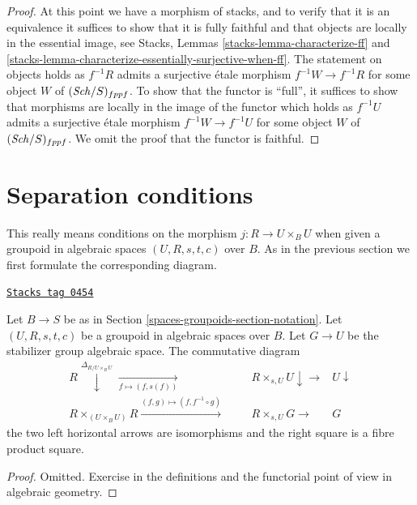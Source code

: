 \begin{proof}
\medskip\noindent
At this point we have a morphism of stacks, and to verify that it is an
equivalence it suffices to show that it is fully faithful and that
objects are locally in the essential image, see
Stacks, Lemmas \ref{stacks-lemma-characterize-ff} and
\ref{stacks-lemma-characterize-essentially-surjective-when-ff}.
The statement on objects holds as $f^{-1}R$ admits a surjective \'etale
morphism $f^{-1}W \to f^{-1}R$ for some object $W$ of
$(\mathit{Sch}/S)_{fppf}$. To show that the functor is ``full'', it
suffices to show that morphisms are locally in the image
of the functor which holds as $f^{-1}U$ admits a surjective \'etale morphism
$f^{-1}W \to f^{-1}U$ for some object $W$ of $(\mathit{Sch}/S)_{fppf}$.
We omit the proof that the functor is faithful.
\end{proof}

\section{Separation conditions}
\label{spaces-groupoids-section-separation}
This really means conditions on the morphism $j : R \to U \times_B U$
when given a groupoid in algebraic spaces $(U, R, s, t, c)$ over $B$.
As in the previous section we first formulate the corresponding diagram.

\begin{lemma}
\label{spaces-groupoids-lemma-diagram-diagonal}
\href{https://stacks.math.columbia.edu/tag/0454}{\texttt{Stacks tag 0454}}

Let $B \to S$ be as in Section \ref{spaces-groupoids-section-notation}.
Let $(U, R, s, t, c)$ be a groupoid in algebraic spaces over $B$.
Let $G \to U$ be the stabilizer group algebraic space.
The commutative diagram
$$
\begin{array}{ccccc}R \overset{\Delta_{R/U \times_B U}}{\downarrow}\underset{f \mapsto (f, s(f))}{\longrightarrow} &  &  & R \times_{s, U} U \downarrow\longrightarrow & U \downarrow \\ R \times_{(U \times_B U)} R \overset{(f, g) \mapsto (f, f^{-1} \circ g)}{\longrightarrow} &  &  & R \times_{s, U} G \longrightarrow & G\end{array}
$$
the two left horizontal arrows are isomorphisms
and the right square is a fibre product square.
\end{lemma}

\begin{proof}
Omitted.
Exercise in the definitions and the functorial point of
view in algebraic geometry.
\end{proof}

